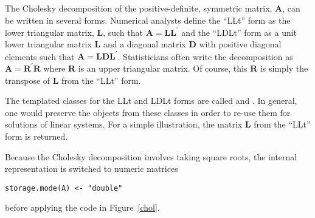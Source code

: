 \documentclass[shortnames,article]{jss}
\begin{document}
The Cholesky decomposition of the positive-definite, symmetric matrix,
$\bm A$, can be written in several forms.  Numerical analysts define
the ``LLt'' form as the lower triangular matrix, $\bm L$, such that
$\bm A=\bm L\bm L^\prime$ and the ``LDLt'' form as a unit lower
triangular matrix $\bm L$ and a diagonal matrix $\bm D$ with positive
diagonal elements such that $\bm A=\bm L\bm D\bm L^\prime$.
Statisticians often write the decomposition as $\bm A=\bm R^\prime\bm
R$ where $\bm R$ is an upper triangular matrix.  Of course, this $\bm
R$ is simply the transpose of $\bm L$ from the ``LLt'' form.

The templated  classes for the LLt and LDLt forms are
called  and .  In general, one would preserve the
objects from these classes in order to re-use them for solutions of
linear systems.  For a simple illustration, the matrix $\bm L$
from the ``LLt'' form is returned.

Because the Cholesky decomposition involves taking square roots, the internal
representation is switched to numeric matrices
\begin{verbatim}
storage.mode(A) <- "double"
\end{verbatim}
before applying the code in Figure~\ref{chol}.
\end{document}
